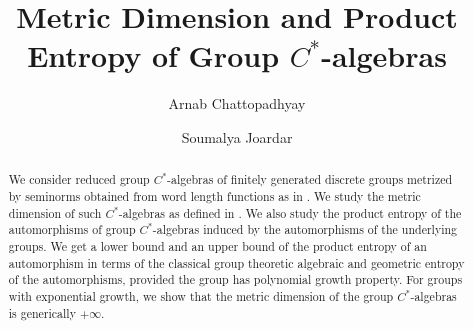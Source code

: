 \documentclass[a4paper,11pt,reqno]{amsart}
\title{Metric Dimension and Product Entropy of Group $C^{\ast}$-algebras}
\author[A. Chattopadhyay]{Arnab Chattopadhyay}
\author[S. Joardar]{Soumalya Joardar}
\theoremstyle{plain}
\theoremstyle{mainthmstyle}
\theoremstyle{named}
\numberwithin{equation}{section}
\begin{document}
\begin{abstract}
 We consider reduced group $C^{\ast}$-algebras of finitely generated discrete groups metrized by seminorms obtained from word length functions as in \cite{Christensen}. We study the metric dimension of such $C^{\ast}$-algebras as defined in \cite{Kerr}. We also study the product entropy of the automorphisms of group $C^{\ast}$-algebras induced by the automorphisms of the underlying groups. We get a lower bound and an upper bound of the product entropy of an automorphism in terms of the classical group theoretic algebraic and geometric entropy of the automorphisms, provided the group has polynomial growth property. For groups with exponential growth, we show that the metric dimension of the group $C^{\ast}$-algebras is generically $+\infty$. 
\end{abstract}
\maketitle
\end{document}
